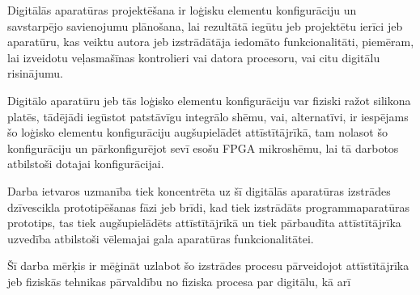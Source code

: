 Digitālās aparatūras projektēšana ir loģisku elementu konfigurāciju un savstarpējo savienojumu plānošana, lai
rezultātā iegūtu jeb projektētu ierīci jeb aparatūru, kas veiktu autora jeb izstrādātāja iedomāto funkcionalitāti, piemēram,
lai izveidotu veļasmašīnas kontrolieri vai datora procesoru, vai citu digitālu risinājumu.  
  
Digitālo aparatūru jeb tās loģisko elementu konfigurāciju var fiziski ražot silikona platēs, tādējādi iegūstot patstāvīgu integrālo
shēmu, vai, alternatīvi, ir iespējams šo loģisko elementu konfigurāciju augšupielādēt attīstītājrīkā, tam nolasot šo konfigurāciju un 
pārkonfigurējot sevī esošu FPGA mikroshēmu, lai tā darbotos atbilstoši dotajai konfigurācijai.  

Darba ietvaros uzmanība tiek koncentrēta uz šī digitālās aparatūras izstrādes dzīvescikla prototipēšanas fāzi jeb brīdi, kad
tiek izstrādāts programmaparatūras prototips, tas tiek augšupielādēts attīstītājrīkā un tiek pārbaudīta attīstītājrīka uzvedība
atbilstoši vēlemajai gala aparatūras funkcionalitātei.

Šī darba mērķis ir mēģināt uzlabot šo izstrādes procesu pārveidojot attīstītājrīka jeb fiziskās tehnikas pārvaldību no fiziska procesa
par digitālu, kā arī

